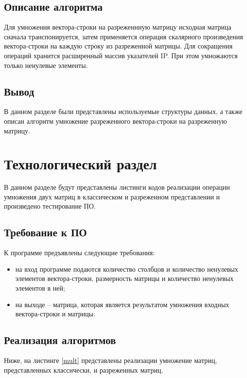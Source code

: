 \section{Описание алгоритма}

Для умножения вектора-строки на разреженнную матрицу исходная матрица сначала транспонируется, затем применяется операция скалярного произведения вектора-строки на каждую строку из разреженной матрицы. Для сокращения операций хранится расширенный массив указателей IP. При этом умножаются только ненулевые элементы.

\section{Вывод}

В данном разделе были представлены используемые структуры данных, а также описан алгоритм умножение разреженного вектора-строки на разреженную матрицу.


\chapter{Технологический раздел}

В данном разделе будут представлены листинги кодов реализации операции умножения двух матриц в классическом и разреженном представлении и произведено тестирование ПО.

\section{Требование к ПО}

К программе предъявлены следующие требования:

\begin{itemize}[$\bullet$]
	\item на вход программе подаются количество столбцов и количество ненулевых элементов вектора-строки, размерность матрицы и количество ненулевых элементов в ней;
	\item на выходе -- матрица, которая является результатом умножения входных вектора-строки и матрицы.
\end{itemize}

\section{Реализация алгоритмов}

Ниже, на листинге \ref{mult} представлены реализации умножение матриц, представленных классически, и разреженных матриц.

